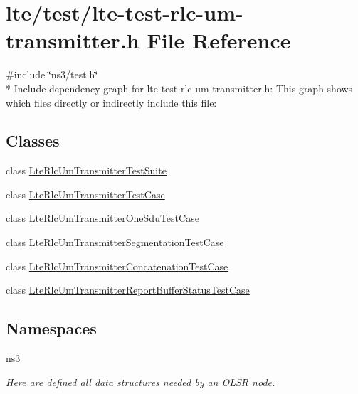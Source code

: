 \hypertarget{lte-test-rlc-um-transmitter_8h}{}\section{lte/test/lte-\/test-\/rlc-\/um-\/transmitter.h File Reference}
\label{lte-test-rlc-um-transmitter_8h}
{\ttfamily \#include \char`\"{}ns3/test.\+h\char`\"{}}\\*
Include dependency graph for lte-\/test-\/rlc-\/um-\/transmitter.h\+:
This graph shows which files directly or indirectly include this file\+:
\subsection*{Classes}
\begin{DoxyCompactItemize}
\item 
class \hyperlink{classLteRlcUmTransmitterTestSuite}{Lte\+Rlc\+Um\+Transmitter\+Test\+Suite}
\item 
class \hyperlink{classLteRlcUmTransmitterTestCase}{Lte\+Rlc\+Um\+Transmitter\+Test\+Case}
\item 
class \hyperlink{classLteRlcUmTransmitterOneSduTestCase}{Lte\+Rlc\+Um\+Transmitter\+One\+Sdu\+Test\+Case}
\item 
class \hyperlink{classLteRlcUmTransmitterSegmentationTestCase}{Lte\+Rlc\+Um\+Transmitter\+Segmentation\+Test\+Case}
\item 
class \hyperlink{classLteRlcUmTransmitterConcatenationTestCase}{Lte\+Rlc\+Um\+Transmitter\+Concatenation\+Test\+Case}
\item 
class \hyperlink{classLteRlcUmTransmitterReportBufferStatusTestCase}{Lte\+Rlc\+Um\+Transmitter\+Report\+Buffer\+Status\+Test\+Case}
\end{DoxyCompactItemize}
\subsection*{Namespaces}
\begin{DoxyCompactItemize}
\item 
 \hyperlink{namespacens3}{ns3}
\begin{DoxyCompactList}\small\item\em Here are defined all data structures needed by an O\+L\+SR node. \end{DoxyCompactList}\end{DoxyCompactItemize}
